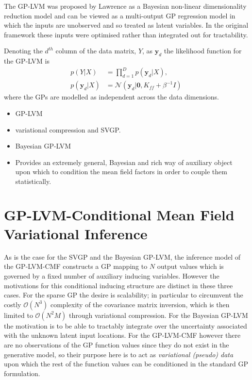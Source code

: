 \documentclass[]{article}
\begin{document}
The GP-LVM was proposed by Lawrence as a Bayesian non-linear dimensionality reduction model and can be viewed as a multi-output GP regression model in which the inputs are unobserved and so treated as latent variables.
In the original framework these inputs were optimised rather than integrated out for tractability.

Denoting the $d^{th}$ column of the data matrix, $Y$, as $\mathbf{y}_d$ the likelihood function for the GP-LVM is
%
\begin{align}
  p(Y|X) &= \prod_{d=1}^D p(\mathbf{y}_d | X),\\
  p(\mathbf{y}_d|X) &= \mathcal{N}(\mathbf{y}_d|\mathbf{0}, K_{ff}+\beta^{-1}I)
\end{align}
%
where the GPs are modelled as independent across the data dimensions.

\begin{itemize}
  \item GP-LVM
  \item variational compression and SVGP.
  \item Bayesian GP-LVM
  \item Provides an extremely general, Bayesian and rich way of auxiliary object upon which to condition the mean field factors in order to couple them statistically.
\end{itemize}

\section{GP-LVM-Conditional Mean Field Variational Inference} \label{sec:gplvmcmf}

As is the case for the SVGP and the Bayesian GP-LVM, the inference model of the GP-LVM-CMF constructs a GP mapping to $N$ output values which is governed by a fixed number of auxiliary inducing variables.
However the motivations for this conditional inducing structure are distinct in these three cases.
For the sparse GP the desire is scalability; in particular to circumvent the costly $\mathcal{O}(N^3)$ complexity of the covariance matrix inversion, which is then limited to $\mathcal{O}(N^2M)$ through variational compression.
For the Bayesian GP-LVM the motivation is to be able to tractably integrate over the uncertainty associated with the unknown latent input locations.
For the GP-LVM-CMF however there are no observations of the GP function values since they do not exist in the generative model, so their purpose here is to act as \emph{variational (pseudo) data} upon which the rest of the function values can be conditioned in the standard GP formulation.
\end{document}
